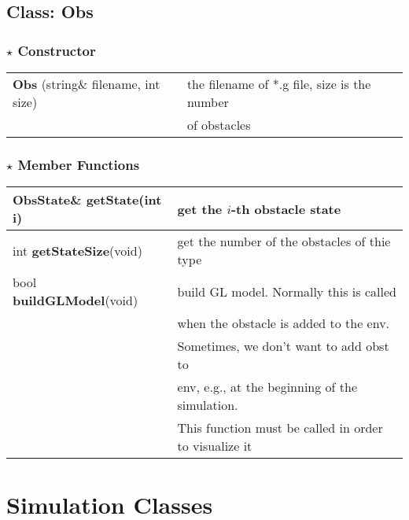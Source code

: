 \documentclass[onecolumn,10pt]{article}
\begin{document}
\subsection{Class: Obs}

\subsubsection*{$\star$ Constructor}

\begin{tabular}{|l|l|}\hline
{\bf Obs}
(string\& filename, int size)   & the filename of *.g file, size is the number \\
                                 & of obstacles \\\hline
\end{tabular}

\subsubsection*{$\star$ Member Functions}

\begin{tabular}{|l|l|} \hline
ObsState\& {\bf getState}(int i)  & get the $i$-th obstacle state \\\hline
int {\bf getStateSize}(void)          & get the number of the obstacles of thie type\\\hline
bool {\bf buildGLModel}(void)         & build GL model. Normally this is called \\
                                      & when the obstacle is added to the env. \\
			              & Sometimes, we don't want to add obst to \\
 			              & env, e.g., at the beginning of the simulation. \\
			              & This function must be called in order to visualize it \\\hline
\end{tabular}

\section{Simulation Classes}
\end{document}
